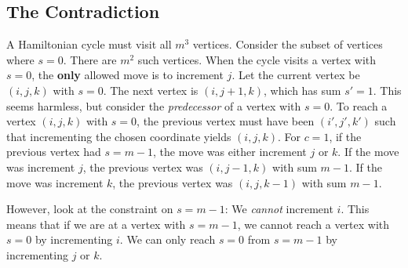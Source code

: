 \documentclass[12pt]{article}
\begin{document}
\subsection{The Contradiction}
A Hamiltonian cycle must visit all $m^3$ vertices. Consider the subset of vertices where $s=0$. There are $m^2$ such vertices.
When the cycle visits a vertex with $s=0$, the \textbf{only} allowed move is to increment $j$.
Let the current vertex be $(i, j, k)$ with $s=0$. The next vertex is $(i, j+1, k)$, which has sum $s'=1$.
This seems harmless, but consider the \textit{predecessor} of a vertex with $s=0$.
To reach a vertex $(i, j, k)$ with $s=0$, the previous vertex must have been $(i', j', k')$ such that incrementing the chosen coordinate yields $(i, j, k)$.
For $c=1$, if the previous vertex had $s=m-1$, the move was either increment $j$ or $k$.
If the move was increment $j$, the previous vertex was $(i, j-1, k)$ with sum $m-1$.
If the move was increment $k$, the previous vertex was $(i, j, k-1)$ with sum $m-1$.

However, look at the constraint on $s=m-1$: We \textit{cannot} increment $i$.
This means that if we are at a vertex with $s=m-1$, we cannot reach a vertex with $s=0$ by incrementing $i$. We can only reach $s=0$ from $s=m-1$ by incrementing $j$ or $k$.
\end{document}
